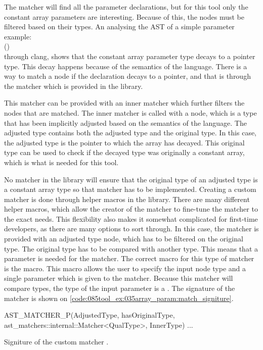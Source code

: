 The  matcher will find all the parameter declarations, but for this tool only the constant array parameters are interesting. Because of this, the nodes must be filtered based on their types. An analysing the AST of a simple parameter example:\\ ()\\
through clang, shows that the constant array parameter type decays to a pointer type. This decay happens because of the semantics of the language. There is a way to match a node if the declaration decays to a pointer, and that is through the  matcher which is provided in the library.

This matcher can be provided with an inner matcher which further filters the nodes that are matched. The inner matcher is called with a  node, which is a type that has been implicitly adjusted based on the semantics of the language. The adjusted type contains both the adjusted type and the original type. In this case, the adjusted type is the pointer to which the array has decayed. This original type can be used to check if the decayed type was originally a constant array, which is what is needed for this tool. 

No matcher in the library will ensure that the original type of an adjusted type is a constant array type so that matcher has to be implemented. Creating a custom matcher is done through helper macros in the library. There are many different helper macros, which allow the creator of the matcher to fine-tune the matcher to the exact needs. This flexibility also makes it somewhat complicated for first-time developers, as there are many options to sort through. In this case, the matcher is provided with an adjusted type node, which has to be filtered on the original type. The original type has to be compared with another type. This means that a parameter is needed for the matcher. The correct macro for this type of matcher is the  macro. This macro allows the user to specify the input node type and a single parameter which is given to the matcher. Because this matcher will compare types, the type of the input parameter is a . The signature of the matcher is shown on \cref{code:085tool_ex:035array_param:match_signiture}.

\begin{listing}[H]
    \begin{cppcode}
AST_MATCHER_P(AdjustedType, hasOriginalType,
                  ast_matchers::internal::Matcher<QualType>, InnerType) {
    ...
}
    \end{cppcode}
    \caption{Signiture of the custom matcher .}
    \label{code:085tool_ex:035array_param:match_signiture}
\end{listing}

